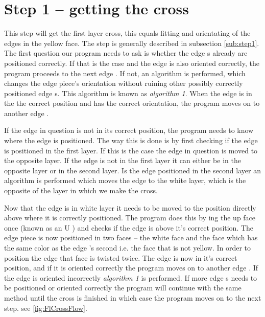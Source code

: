 \section{Step 1 -- getting the cross}
This step will get the first layer cross, this equals fitting and orientating of the edges in the yellow face. 
The step is generally described in subsection \ref{sub:step1}.
The first question our program needs to ask is whether the edge \cpiece{}s already are positioned correctly. If that is the case and the edge \cpiece{} is also oriented correctly, the program proceeds to the next edge \cpiece{}. If not, an algorithm is performed, which changes the edge piece's orientation without ruining other possibly correctly positioned edge \cpiece{}s. 
This algorithm is known as \textit{algorithm 1}. When the edge \cpiece{} is in the the correct position and has the correct orientation, the program moves on to another edge \cpiece{}. 

If the edge \cpiece{} in question is not in its correct position, the program needs to know where the edge is positioned. 
The way this is done is by first checking if the edge \cpiece{} is positioned in the first layer. 
If this is the case the edge \cpiece{} in question is moved to the opposite layer. 
If the edge \cpiece{} is not in the first layer it can either be in the opposite layer or in the second layer.
Is the edge \cpiece{}  positioned in the second layer an algorithm is performed which moves the edge \cpiece{}  to the white layer, which is the opposite of the layer in which we make the cross.

Now that the edge \cpiece{}  is in white layer it needs to be moved to the position directly above where it is correctly positioned. 
The program does this by \twist{}ing the up face once (known as an U \twist{}) and checks if the edge \cpiece{} is above it's correct position.
The edge piece is now positioned in two faces -- the white face and the face which has the same color as the edge  \cpiece{}'s second \facelet{} i.e. the face that is not yellow.
In order to position the edge \cpiece{} that face is twisted twice.
The edge \cpiece{}  is now in it's correct position, and if it is oriented correctly the program moves on to another edge  \cpiece{} .
If the edge \cpiece{} is oriented incorrectly \textit{algorithm 1} is performed. If more edge  \cpiece{}s needs to be positioned or oriented correctly the program will continue with the same method until the cross is finished in which case the program moves on to the next step. see \ref{fig:FlCrossFlow}.

